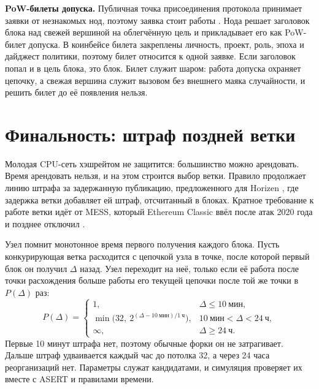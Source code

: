 \documentclass[10pt,a4paper]{article}
\begin{document}
\textbf{PoW-билеты допуска.}
Публичная точка присоединения протокола принимает заявки от незнакомых нод, поэтому заявка стоит работы \cite{dworknaor,hashcash}.
Нода решает заголовок блока над свежей вершиной на облегчённую цель и прикладывает его как PoW-билет допуска.
В коинбейсе билета закреплены личность, проект, роль, эпоха и дайджест политики, поэтому билет относится к одной заявке.
Если заголовок попал и в цель блока, это блок.
Билет служит шаром: работа допуска охраняет цепочку, а свежая вершина служит вызовом без внешнего маяка случайности, и решить билет до её появления нельзя.

\section{Финальность: штраф поздней ветки}
\label{sec:finality}

Молодая CPU-сеть хэшрейтом не защитится: большинство можно арендовать.
Время арендовать нельзя, и на этом строится выбор ветки.
Правило продолжает линию штрафа за задержанную публикацию, предложенного для Horizen \cite{horizen}, где задержка ветки добавляет ей штраф, отсчитанный в блоках.
Кратное требование к работе ветки идёт от MESS, который Ethereum Classic ввёл после атак 2020 года \cite{mess} и позднее отключил \cite{messoff}.

Узел помнит монотонное время первого получения каждого блока.
Пусть конкурирующая ветка расходится с цепочкой узла в точке, после которой первый блок он получил $\Delta$ назад.
Узел переходит на неё, только если её работа после точки расхождения больше работы его текущей цепочки после той же точки в $P(\Delta)$ раз:
\[
P(\Delta)=
\begin{cases}
1, & \Delta\le 10~\text{мин},\\
\min\!\bigl(32,\ 2^{(\Delta-10~\text{мин})/1~\text{ч}}\bigr), & 10~\text{мин}<\Delta<24~\text{ч},\\
\infty, & \Delta\ge 24~\text{ч}.
\end{cases}
\]
Первые 10 минут штрафа нет, поэтому обычные форки он не затрагивает.
Дальше штраф удваивается каждый час до потолка 32, а через 24 часа реорганизаций нет.
Параметры служат кандидатами, и симуляция проверяет их вместе с ASERT и правилами времени.
\end{document}
